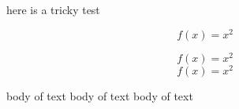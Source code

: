 here is a tricky test 
\begin{myenv}
	\begin{equation*}
		f(x)=x^2
	\end{equation*}
\end{myenv} 
\begin{equation*}
	f(x)=x^2
\end{equation*}
\begin{equation*}
	f(x)=x^2
\end{equation*} 

\begin{myen}
	body of text
	body of text
	body of text
\end{myen}
